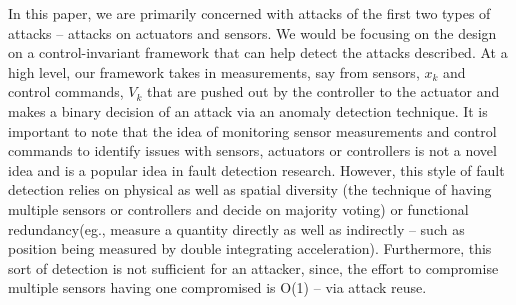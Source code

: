 In this paper, we are primarily concerned with attacks of the first two types of attacks -- attacks on actuators and sensors. We would be focusing on the design on a control-invariant framework that can help detect the attacks described. At a high level, our framework takes in measurements, say from sensors, $x_k$ and control commands, $V_k$  that are pushed out by the controller to the actuator and makes a binary decision of an attack via an anomaly detection technique. It is important to note that the idea of monitoring sensor measurements and control commands to identify issues with sensors, actuators or controllers is not a novel idea and is a popular idea in fault detection research. However, this style of fault detection relies on physical as well as spatial diversity (the technique of having multiple sensors or controllers and decide on majority voting) or functional redundancy(eg., measure a quantity directly as well as indirectly -- such as position being measured by double integrating acceleration). Furthermore, this sort of detection is not sufficient for an attacker, since, the effort to compromise multiple sensors having one compromised is O(1) -- via attack reuse.



